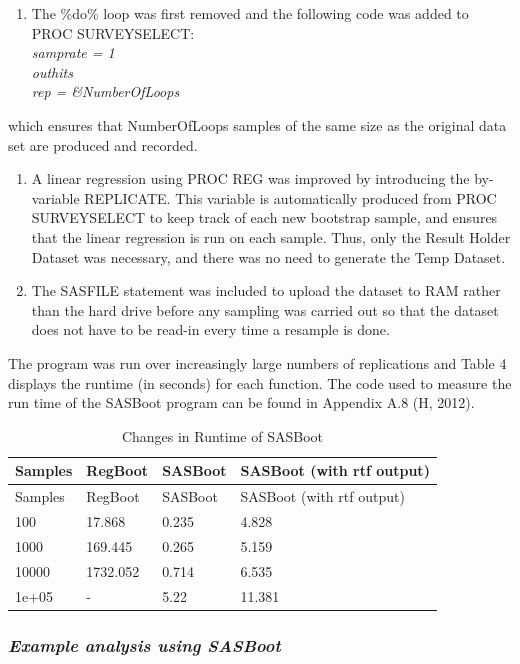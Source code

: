 \documentclass[]{article}
\providecommand{\tightlist}{%
  \setlength{\itemsep}{0pt}\setlength{\parskip}{0pt}}
\begin{document}
\begin{enumerate}
\def\labelenumi{\arabic{enumi}.}
\tightlist
\item
  The \%do\% loop was first removed and the following code was added to
  PROC SURVEYSELECT:\\
  \emph{samprate = 1}\\
  \emph{outhits}\\
  \emph{rep = \&NumberOfLoops}
\end{enumerate}

which ensures that NumberOfLoops samples of the same size as the
original data set are produced and recorded.

\begin{enumerate}
\def\labelenumi{\arabic{enumi}.}
\setcounter{enumi}{1}
\item
  A linear regression using PROC REG was improved by introducing the
  by-variable REPLICATE. This variable is automatically produced from
  PROC SURVEYSELECT to keep track of each new bootstrap sample, and
  ensures that the linear regression is run on each sample. Thus, only
  the Result Holder Dataset was necessary, and there was no need to
  generate the Temp Dataset.
\item
  The SASFILE statement was included to upload the dataset to RAM rather
  than the hard drive before any sampling was carried out so that the
  dataset does not have to be read-in every time a resample is done.
\end{enumerate}

The program was run over increasingly large numbers of replications and
Table 4 displays the runtime (in seconds) for each function. The code
used to measure the run time of the SASBoot program can be found in
Appendix A.8 (H, 2012).

\pagebreak

\begin{longtable}[]{@{}llll@{}}
\caption{Changes in Runtime of SASBoot}\tabularnewline
\toprule
Samples & RegBoot & SASBoot & SASBoot (with rtf output)\tabularnewline
\midrule
\endfirsthead
\toprule
Samples & RegBoot & SASBoot & SASBoot (with rtf output)\tabularnewline
\midrule
\endhead
100 & 17.868 & 0.235 & 4.828\tabularnewline
1000 & 169.445 & 0.265 & 5.159\tabularnewline
10000 & 1732.052 & 0.714 & 6.535\tabularnewline
1e+05 & - & 5.22 & 11.381\tabularnewline
\bottomrule
\end{longtable}

\subsubsection{\texorpdfstring{\emph{Example analysis using
SASBoot}}{Example analysis using SASBoot}}\label{example-analysis-using-sasboot}
\end{document}
